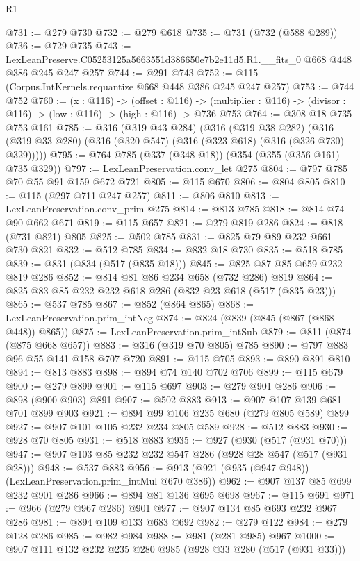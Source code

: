 \begin{lexlean}{R1}
\begin{coremodule}
@731 := @279 @730
@732 := @279 @618
@735 := @731 (@732 (@588 @289))
@736 := @729 @735
@743 := LexLeanPreserve.C05253125a5663551d386650e7b2e11d5.R1.__fits_0 @668 @448 @386 @245 @247 @257
@744 := @291 @743
@752 := @115 (Corpus.IntKernels.requantize @668 @448 @386 @245 @247 @257)
@753 := @744 @752
@760 := (x : @116) ->
  (offset : @116) ->
  (multiplier : @116) -> (divisor : @116) -> (low : @116) -> (high : @116) -> @736 @753
@764 := @308 @18 @735 @753 @161
@785 := @316
    (@319 @43 @284)
    (@316
      (@319 @38 @282)
      (@316 (@319 @33 @280) (@316 (@320 @547) (@316 (@323 @618) (@316 (@326 @730) @329)))))
@795 := @764 @785 (@337 (@348 @18)) (@354 (@355 (@356 @161) @735 @329))
@797 := LexLeanPreservation.conv_let @275
@804 := @797 @785 @70 @55 @91 @159 @672 @721
@805 := @115 @670
@806 := @804 @805
@810 := @115 (@297 @711 @247 @257)
@811 := @806 @810
@813 := LexLeanPreservation.conv_prim @275
@814 := @813 @785
@818 := @814 @74 @90 @662 @671
@819 := @115 @657
@821 := @279 @819 @286
@824 := @818 (@731 @821) @805
@825 := @502 @785
@831 := @825 @79 @89 @232 @661 @730 @821
@832 := @512 @785
@834 := @832 @18 @730
@835 := @518 @785
@839 := @831 (@834 (@517 (@835 @18)))
@845 := @825 @87 @85 @659 @232 @819 @286
@852 := @814 @81 @86 @234 @658 (@732 @286) @819
@864 := @825 @83 @85 @232 @232 @618 @286 (@832 @23 @618 (@517 (@835 @23)))
@865 := @537 @785
@867 := @852 (@864 @865)
@868 := LexLeanPreservation.prim_intNeg
@874 := @824 (@839 (@845 (@867 (@868 @448)) @865))
@875 := LexLeanPreservation.prim_intSub
@879 := @811 (@874 (@875 @668 @657))
@883 := @316 (@319 @70 @805) @785
@890 := @797 @883 @96 @55 @141 @158 @707 @720
@891 := @115 @705
@893 := @890 @891 @810
@894 := @813 @883
@898 := @894 @74 @140 @702 @706
@899 := @115 @679
@900 := @279 @899
@901 := @115 @697
@903 := @279 @901 @286
@906 := @898 (@900 @903) @891
@907 := @502 @883
@913 := @907 @107 @139 @681 @701 @899 @903
@921 := @894 @99 @106 @235 @680 (@279 @805 @589) @899
@927 := @907 @101 @105 @232 @234 @805 @589
@928 := @512 @883
@930 := @928 @70 @805
@931 := @518 @883
@935 := @927 (@930 (@517 (@931 @70)))
@947 := @907 @103 @85 @232 @232 @547 @286 (@928 @28 @547 (@517 (@931 @28)))
@948 := @537 @883
@956 := @913 (@921 (@935 (@947 @948)) (LexLeanPreservation.prim_intMul @670 @386))
@962 := @907 @137 @85 @699 @232 @901 @286
@966 := @894 @81 @136 @695 @698
@967 := @115 @691
@971 := @966 (@279 @967 @286) @901
@977 := @907 @134 @85 @693 @232 @967 @286
@981 := @894 @109 @133 @683 @692
@982 := @279 @122
@984 := @279 @128 @286
@985 := @982 @984
@988 := @981 (@281 @985) @967
@1000 := @907 @111 @132 @232 @235 @280 @985 (@928 @33 @280 (@517 (@931 @33)))

\end{coremodule}
\end{lexlean}
